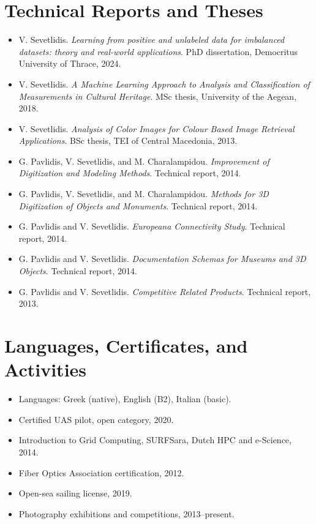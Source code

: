 \documentclass[11pt,a4paper]{article}
\newcommand{\cvsection}[1]{\section*{#1}}
\begin{document}
\cvsection{Technical Reports and Theses}
\begin{itemize}
  \item V. Sevetlidis. \textit{Learning from positive and unlabeled data for imbalanced datasets: theory and real-world applications}. PhD dissertation, Democritus University of Thrace, 2024.
  \item V. Sevetlidis. \textit{A Machine Learning Approach to Analysis and Classification of Measurements in Cultural Heritage}. MSc thesis, University of the Aegean, 2018.
  \item V. Sevetlidis. \textit{Analysis of Color Images for Colour Based Image Retrieval Applications}. BSc thesis, TEI of Central Macedonia, 2013.
  \item G. Pavlidis, V. Sevetlidis, and M. Charalampidou. \textit{Improvement of Digitization and Modeling Methods}. Technical report, 2014.
  \item G. Pavlidis, V. Sevetlidis, and M. Charalampidou. \textit{Methods for 3D Digitization of Objects and Monuments}. Technical report, 2014.
  \item G. Pavlidis and V. Sevetlidis. \textit{Europeana Connectivity Study}. Technical report, 2014.
  \item G. Pavlidis and V. Sevetlidis. \textit{Documentation Schemas for Museums and 3D Objects}. Technical report, 2014.
  \item G. Pavlidis and V. Sevetlidis. \textit{Competitive Related Products}. Technical report, 2013.
\end{itemize}

\cvsection{Languages, Certificates, and Activities}
\begin{itemize}
  \item Languages: Greek (native), English (B2), Italian (basic).
  \item Certified UAS pilot, open category, 2020.
  \item Introduction to Grid Computing, SURFSara, Dutch HPC and e-Science, 2014.
  \item Fiber Optics Association certification, 2012.
  \item Open-sea sailing license, 2019.
  \item Photography exhibitions and competitions, 2013--present.
\end{itemize}
\end{document}
